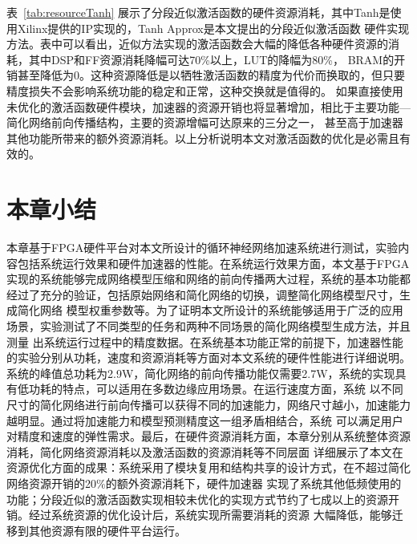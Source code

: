 表~\ref{tab:resourceTanh} 展示了分段近似激活函数的硬件资源消耗，其中Tanh是使用Xilinx提供的IP实现的，Tanh Approx是本文提出的分段近似激活函数
硬件实现方法。表中可以看出，近似方法实现的激活函数会大幅的降低各种硬件资源的消耗，其中DSP和FF资源消耗降幅可达70\%以上，LUT的降幅为80\%，
BRAM的开销甚至降低为0。这种资源降低是以牺牲激活函数的精度为代价而换取的，但只要精度损失不会影响系统功能的稳定和正常，这种交换就是值得的。
如果直接使用未优化的激活函数硬件模块，加速器的资源开销也将显著增加，相比于主要功能---简化网络前向传播结构，主要的资源增幅可达原来的三分之一，
甚至高于加速器其他功能所带来的额外资源消耗。以上分析说明本文对激活函数的优化是必需且有效的。


\section{本章小结}

本章基于FPGA硬件平台对本文所设计的循环神经网络加速系统进行测试，实验内容包括系统运行效果和硬件加速器的性能。在系统运行效果方面，本文基于FPGA
实现的系统能够完成网络模型压缩和网络的前向传播两大过程，系统的基本功能都经过了充分的验证，包括原始网络和简化网络的切换，调整简化网络模型尺寸，生成简化网络
模型权重参数等。为了证明本文所设计的系统能够适用于广泛的应用场景，实验测试了不同类型的任务和两种不同场景的简化网络模型生成方法，并且测量
出系统运行过程中的精度数据。在系统基本功能正常的前提下，加速器性能的实验分别从功耗，速度和资源消耗等方面对本文系统的硬件性能进行详细说明。
系统的峰值总功耗为2.9W，简化网络的前向传播功能仅需要2.7W，系统的实现具有低功耗的特点，可以适用在多数边缘应用场景。在运行速度方面，系统
以不同尺寸的简化网络进行前向传播可以获得不同的加速能力，网络尺寸越小，加速能力越明显。通过将加速能力和模型预测精度这一组矛盾相结合，系统
可以满足用户对精度和速度的弹性需求。最后，在硬件资源消耗方面，本章分别从系统整体资源消耗，简化网络资源消耗以及激活函数的资源消耗等不同层面
详细展示了本文在资源优化方面的成果：系统采用了模块复用和结构共享的设计方式，在不超过简化网络资源开销的20\%的额外资源消耗下，硬件加速器
实现了系统其他低频使用的功能；分段近似的激活函数实现相较未优化的实现方式节约了七成以上的资源开销。经过系统资源的优化设计后，系统实现所需要消耗的资源
大幅降低，能够迁移到其他资源有限的硬件平台运行。







%
